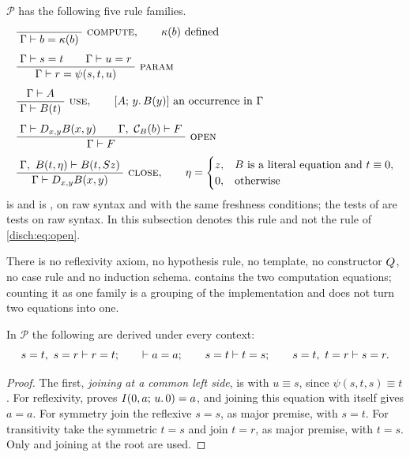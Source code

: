 \begin{definition}
\label{disch:def:param}
$\mathcal P$ has the following five rule families.
\begin{align}
 &\infrule{}{\Gamma\proves b=\kappa(b)}\ \rulename{Compute},
 \qquad\kappa(b)\text{ defined}
 \label{disch:eq:compute}\\[1ex]
 &\infrule{\Gamma\proves s=t\qquad\Gamma\proves u=r}
          {\Gamma\proves r=\psi(s,t,u)}\ \rulename{Param}
 \label{disch:eq:param}\\[1ex]
 &\infrule{\Gamma\proves A}{\Gamma\proves B(t)}\ \rulename{Use},
 \qquad [A;\,y.\,B(y)]\text{ an occurrence in }\Gamma
 \notag\\[1ex]
 &\infrule{\Gamma\proves\D{x}{y}B(x,y)\qquad
           \Gamma,\ \mathcal C_B(b)\proves F}
          {\Gamma\proves F}\ \rulename{Open}
 \notag\\[1ex]
 &\infrule{\Gamma,\ B(t,\eta)\proves B(t,\Suc z)}
          {\Gamma\proves\D{x}{y}B(x,y)}\ \rulename{Close},
 \qquad
 \eta=\begin{cases}
 z,&B\text{ is a literal equation and }t\equiv 0,\\
 0,&\text{otherwise}
 \end{cases}
 \notag
\end{align}
 is  and  is
, on raw syntax and with the same freshness conditions;
the tests of  are tests on raw syntax. In this subsection
 denotes this rule and not the rule of
\cref{disch:eq:open}.
\end{definition}

There is no reflexivity axiom, no hypothesis rule, no template, no
constructor $Q_{}$, no case rule and no induction schema.
 contains the two computation equations; counting it as
one family is a grouping of the implementation and does not turn two
equations into one.

\begin{lemma}
\label{disch:lem:root}
In $\mathcal P$ the following are derived under every context:
\[
 s=t,\ s=r\vdash r=t;\qquad
 \vdash a=a;\qquad
 s=t\vdash t=s;\qquad
 s=t,\ t=r\vdash s=r .
\]
\end{lemma}

\begin{proof}
The first, \emph{joining at a common left side}, is  with
$u\equiv s$, since $\psi(s,t,s)\equiv t$. For reflexivity,
 proves $I(0,a;\,u.\,0)=a$, and joining this equation
with itself gives $a=a$. For symmetry join the reflexive $s=s$, as major
premise, with $s=t$. For transitivity take the symmetric $t=s$ and join
$t=r$, as major premise, with $t=s$. Only  and joining
at the root are used.
\end{proof}

